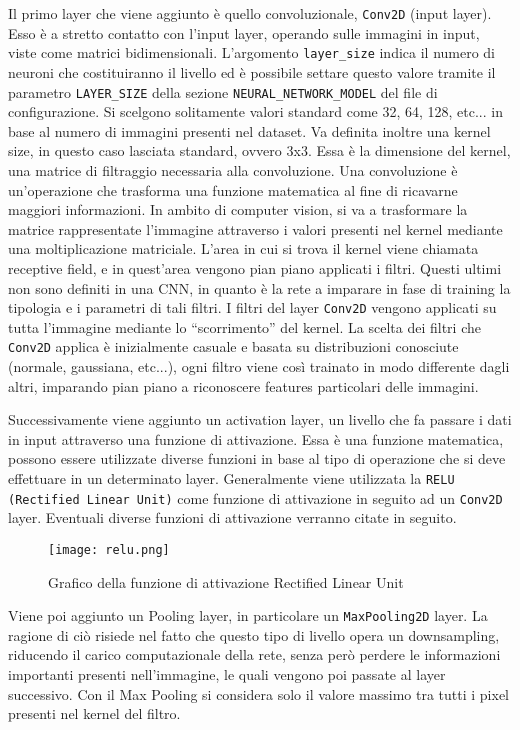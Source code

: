 Il primo layer che viene aggiunto è quello convoluzionale, \texttt{Conv2D} (input layer). Esso è a stretto contatto con l’input layer, operando sulle immagini in input, viste come matrici bidimensionali. L’argomento \texttt{layer\_size} indica il numero di neuroni che costituiranno il livello ed è possibile settare questo valore tramite il parametro \texttt{LAYER\_SIZE} della sezione \texttt{NEURAL\_NETWORK\_MODEL} del file di configurazione. Si scelgono solitamente valori standard come 32, 64, 128, etc... in base al numero di immagini presenti nel dataset. Va definita inoltre una kernel size, in questo caso lasciata standard, ovvero 3x3. Essa è la dimensione del kernel, una matrice di filtraggio necessaria alla convoluzione. Una convoluzione è un’operazione che trasforma una funzione matematica al fine di ricavarne maggiori informazioni. In ambito di computer vision, si va a trasformare la matrice rappresentate l’immagine attraverso i valori presenti nel kernel mediante una moltiplicazione matriciale. L’area in cui si trova il kernel viene chiamata receptive field, e in quest’area vengono pian piano applicati i filtri. Questi ultimi non sono definiti in una CNN, in quanto è la rete a imparare in fase di training la tipologia e i parametri di tali filtri. I filtri del layer \texttt{Conv2D} vengono applicati su tutta l’immagine mediante lo “scorrimento” del kernel. La scelta dei filtri che \texttt{Conv2D} applica è inizialmente casuale e basata su distribuzioni conosciute (normale, gaussiana, etc...), ogni filtro viene così trainato in modo differente dagli altri, imparando pian piano a riconoscere features particolari delle immagini. 

Successivamente viene aggiunto un activation layer, un livello che fa passare i dati in input attraverso una funzione di attivazione. Essa è una funzione matematica, possono essere utilizzate diverse funzioni in base al tipo di operazione che si deve effettuare in un determinato layer. Generalmente viene utilizzata la \texttt{RELU (Rectified Linear Unit)} come funzione di attivazione in seguito ad un \texttt{Conv2D} layer. Eventuali diverse funzioni di attivazione verranno citate in seguito.

\begin{figure}[h]
  \centering
  \texttt{[image: relu.png]}
  \caption{Grafico della funzione di attivazione Rectified Linear Unit}
\end{figure}

Viene poi aggiunto un Pooling layer, in particolare un \texttt{MaxPooling2D} layer. La ragione di ciò risiede nel fatto che questo tipo di livello opera un downsampling, riducendo il carico computazionale della rete, senza però perdere le informazioni importanti presenti nell’immagine, le quali vengono poi passate al layer successivo. Con il Max Pooling si considera solo il valore massimo tra tutti i pixel presenti nel kernel del filtro.

